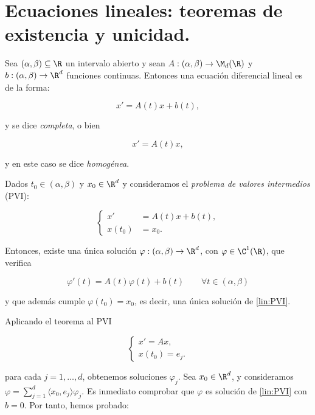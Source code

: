 \section{Ecuaciones lineales: teoremas de existencia y unicidad.}


\begin{ndef}
Sea $(\alpha,\beta)\subseteq \R$ un intervalo abierto y sean $A:(\alpha,\beta)\to \M_d(\R)$ y $b:(\alpha,\beta)\to \R^d$ funciones continuas. Entonces una ecuación diferencial lineal es de la forma:

\begin{equation}
x'=A(t)x+b(t) \tag{C} \label{lin:completa}
,\end{equation}

y se dice \emph{completa}, o bien

\begin{equation}
x'=A(t)x \tag{H} \label{lin:homogenea}
,\end{equation}

y en este caso se dice \emph{homogénea}.
\end{ndef}

\begin{nth}
Dados $t_0\in(\alpha,\beta)$ y $x_0 \in \R^d$ y consideramos el \emph{problema de valores intermedios} (PVI):

\begin{equation}
\left\{\begin{array}{rl}
x' &=A(t)x+b(t), \\
x(t_0)&=x_0.
\end{array}\right.
\tag{PVI}\label{lin:PVI}
\end{equation}

Entonces, existe una única solución $\varphi : (\alpha,\beta)\to\R^d$, con $\varphi \in \C ^ 1(\R)$, que verifica

\[
\varphi'(t) = A(t)\varphi(t) + b(t) \qquad \forall t \in (\alpha,\beta)
\]

y que además cumple $\varphi(t_0)=x_0$, es decir, una única solución de \ref{lin:PVI}.
\end{nth}

Aplicando el teorema al PVI

\[
\begin{cases}
  x' = Ax, \\
  x(t_0) = e_j.
\end{cases}
\tag{PVI$_j$} \label{lin:PVIj}
\]

para cada $j=1,\dots,d$, obtenemos soluciones $\varphi_j$. Sea $x_0\in \R^d$, y consideramos $\varphi = \sum_{j=1}^d \langle x_0,e_j \rangle\varphi_j$.
Es inmediato comprobar que $\varphi$ es solución de \eqref{lin:PVI} con $b=0$. Por tanto, hemos probado:

